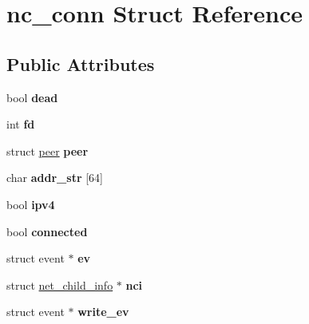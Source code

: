 \hypertarget{structnc__conn}{\section{nc\-\_\-conn Struct Reference}
\label{structnc__conn}
}
\subsection*{Public Attributes}
\begin{DoxyCompactItemize}
\item 
\hypertarget{structnc__conn_a61c30092f6a71cf1cae1b06957f2ff7c}{bool {\bfseries dead}}\label{structnc__conn_a61c30092f6a71cf1cae1b06957f2ff7c}

\item 
\hypertarget{structnc__conn_a9c6f02628cd16c4ad4c46d4529b84a9e}{int {\bfseries fd}}\label{structnc__conn_a9c6f02628cd16c4ad4c46d4529b84a9e}

\item 
\hypertarget{structnc__conn_a0dcf566cd4ac7cc0a3e0ea4abb4d81f6}{struct \hyperlink{structpeer}{peer} {\bfseries peer}}\label{structnc__conn_a0dcf566cd4ac7cc0a3e0ea4abb4d81f6}

\item 
\hypertarget{structnc__conn_a1389e4d7e8975f439cd06ec77e570cfd}{char {\bfseries addr\-\_\-str} \mbox{[}64\mbox{]}}\label{structnc__conn_a1389e4d7e8975f439cd06ec77e570cfd}

\item 
\hypertarget{structnc__conn_acbcc95f4abc3c7c6c6212fa5786c78b1}{bool {\bfseries ipv4}}\label{structnc__conn_acbcc95f4abc3c7c6c6212fa5786c78b1}

\item 
\hypertarget{structnc__conn_a00cdc6dd303fc80ff70ded62d277a1d6}{bool {\bfseries connected}}\label{structnc__conn_a00cdc6dd303fc80ff70ded62d277a1d6}

\item 
\hypertarget{structnc__conn_a9a7e7806d03757baf0a4d777ed4b138b}{struct event $\ast$ {\bfseries ev}}\label{structnc__conn_a9a7e7806d03757baf0a4d777ed4b138b}

\item 
\hypertarget{structnc__conn_aa577405019128fbb5cbe2eca08b953cb}{struct \hyperlink{structnet__child__info}{net\-\_\-child\-\_\-info} $\ast$ {\bfseries nci}}\label{structnc__conn_aa577405019128fbb5cbe2eca08b953cb}

\item 
\hypertarget{structnc__conn_af789d3bda9d07c1b767db1cf80b24407}{struct event $\ast$ {\bfseries write\-\_\-ev}}\label{structnc__conn_af789d3bda9d07c1b767db1cf80b24407}


\end{DoxyCompactItemize}
